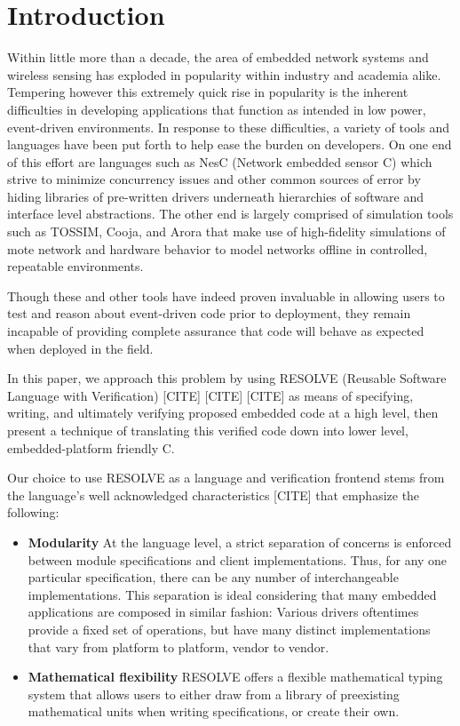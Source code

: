 \documentclass{sig-alternate}
\begin{document}
\section{Introduction}
\label{sec:intro}
Within little more than a decade, the area of embedded network systems and wireless sensing has exploded in popularity within industry and academia alike. Tempering however this extremely quick rise in popularity is the inherent difficulties in developing applications that function as intended in low power, event-driven environments. In response to these difficulties, a variety of tools and languages have been put forth  to help ease the burden on developers. On one end of this effort are languages such as NesC (Network embedded sensor C) which strive to minimize concurrency issues and other common sources of error by hiding libraries of pre-written drivers underneath hierarchies of software and interface level abstractions. The other end is largely comprised of simulation tools such as TOSSIM, Cooja, and Arora that make use of high-fidelity simulations of mote network and hardware behavior to model networks offline in controlled, repeatable environments.

Though these and other tools have indeed proven invaluable in allowing users to test and reason about event-driven code prior to deployment, they remain incapable of providing complete assurance that code will behave as expected when deployed in the field. 

In this paper, we approach this problem by using RESOLVE (Reusable Software Language with Verification) [CITE] [CITE] [CITE] as means of specifying, writing, and ultimately verifying proposed embedded code at a high level, then present a technique of translating this verified code down into lower level, embedded-platform friendly C.  

Our choice to use RESOLVE as a language and verification frontend stems from the language's well acknowledged characteristics [CITE] that emphasize the following:
\begin{itemize}
\item \textbf{Modularity} At the language level, a strict separation of concerns is enforced between module specifications and client implementations. Thus, for any one particular specification, there can be any number of interchangeable implementations. This separation is ideal considering that many embedded applications are composed in similar fashion: Various drivers oftentimes provide a fixed set of operations, but have many distinct implementations that vary from platform to platform, vendor to vendor.

\item \textbf{Mathematical flexibility} RESOLVE offers a flexible mathematical typing system that allows users to either draw from a library of preexisting mathematical units when writing specifications, or create their own. 

\end{itemize}
\end{document}
